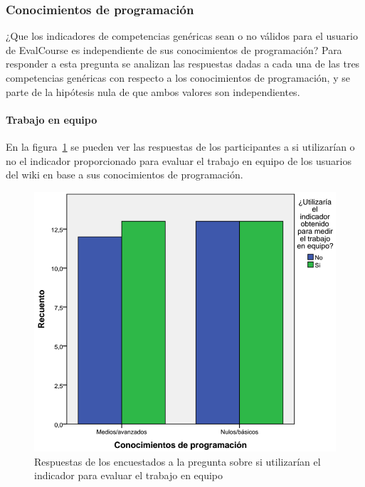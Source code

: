 \subsubsection{Conocimientos de programación}

¿Que los indicadores de competencias genéricas sean o no válidos para el usuario de EvalCourse es independiente de sus conocimientos de programación? Para responder a esta pregunta se analizan las respuestas dadas a cada una de las tres competencias genéricas con respecto a los conocimientos de programación, y se parte de la hipótesis nula de que ambos valores son independientes.

\paragraph*{Trabajo en equipo}

En la figura~\ref{fig:app:barras:programacion:equipo} se pueden ver las respuestas de los participantes a si utilizarían o no el indicador proporcionado para evaluar el trabajo en equipo de los usuarios del wiki en base a sus conocimientos de programación.

\begin{figure}
  \begin{center}
    \includegraphics[scale=0.3]{barras_programacion_equipo.png}
  \end{center}
  \caption{Respuestas de los encuestados a la pregunta sobre si utilizarían el indicador para evaluar el trabajo en equipo}
  \label{fig:app:barras:programacion:equipo}
\end{figure}

